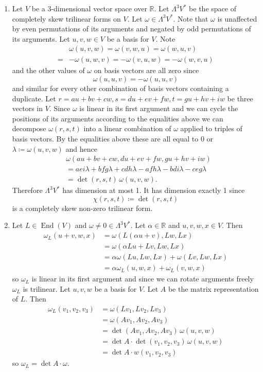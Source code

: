 \documentclass[a4paper, 12pt]{article}
\newcommand{\R}{\mathbb{R}}
\DeclareMathOperator{\Endo}{End}
\begin{document}
\begin{enumerate}
\begin{enumerate}
\item Let \(V\) be a 3-dimensional vector space over \(\R\). Let \(\Lambda^3V^*\) be the space of completely skew trilinear forms on \(V\). Let \(\omega\in\Lambda^3V^*\). Note that \(\omega\) is unaffected by even permutations of its arguments and negated by odd permutations of its arguments. Let \(u,v,w\in V\) be a basis for \(V\). Note
\begin{align*}
&\omega(u,v,w)=\omega(v,w,u)=\omega(w,u,v)\\
{}={}&-\omega(u,w,v)=-\omega(v,u,w)=-\omega(w,v,u)
\end{align*}
and the other values of \(\omega\) on basis vectors are all zero since
\[\omega(u,u,v)=-\omega(u,u,v)\]
and similar for every other combination of basis vectors containing a duplicate. Let \(r=au+bv+cw,s=du+ev+fw,t=gu+hv+iw\) be three vectors in \(V\). Since \(\omega\) is linear in its first argument and we can cycle the positions of its arguments according to the equalities above we can decompose \(\omega(r,s,t)\) into a linear combination of \(\omega\) applied to triples of basis vectors. By the equalities above these are all equal to 0 or \(\lambda\coloneqq\omega(u,v,w)\) and hence
\begin{align*}
&\omega(au+bv+cw,du+ev+fw,gu+hv+iw)\\
&=aei\lambda+bfg\lambda+cdh\lambda-afh\lambda-bdi\lambda-ceg\lambda\\
&=\det(r,s,t)\,\omega(u,v,w).
\end{align*}
Therefore \(\Lambda^3V^*\) has dimension at most 1. It has dimension exactly 1 since
\[\chi(r,s,t)\coloneqq\det(r,s,t)\]
is a completely skew non-zero trilinear form.

\item Let \(L\in\Endo(V)\) and \(\omega\neq0\in\Lambda^3V^*\). Let \(\alpha\in\R\) and \(u,v,w,x\in V\). Then
\begin{align*}
\omega_L(u+v,w,x)&=\omega(L(\alpha u+v),Lw,Lx)\\
&=\omega(\alpha Lu+Lv,Lw,Lx)\\
&=\alpha\omega(Lu,Lw,Lx)+\omega(Lv,Lw,Lx)\\
&=\alpha\omega_L(u,w,x)+\omega_L(v,w,x)
\end{align*}
so \(\omega_L\) is linear in its first argument and since we can rotate arguments freely \(\omega_L\) is trilinear.
Let \(u,v,w\) be a basis for \(V\). Let \(A\) be the matrix representation of \(L\). Then
\begin{align*}
\omega_L(v_1,v_2,v_3)&=\omega(Lv_1,Lv_2,Lv_3)\\
&=\omega(Av_1,Av_2,Av_3)\\
&=\det(Av_1,Av_2,Av_3)\,\omega(u,v,w)\\
&=\det A\cdot\det(v_1,v_2,v_3)\,\omega(u,v,w)\\
&=\det A\cdot w(v_1,v_2,v_3)
\end{align*}
so \(\omega_L=\det A\cdot\omega\).


\end{enumerate}
\end{enumerate}
\end{document}
